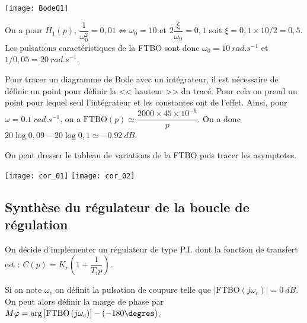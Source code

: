\begin{multicols}{2}

\ifprof
\else
\begin{center}
\texttt{[image: BodeQ1]}
\end{center}
\fi

\ifprof
\begin{corrige}
On a pour $H_1(p)$, $\dfrac{1}{\omega_0^2}=0,01 \Leftrightarrow \omega_0=10$ et $2\dfrac{\xi}{\omega_0}=0,1$ soit $\xi = 0,1\times 10 / 2 = 0,5$. Les pulsations caractéristiques de la FTBO sont donc $\omega_0=\SI{10}{rad.s^{-1}}$ et $1/0,05 = \SI{20}{rad.s^{-1}}$.

Pour tracer un diagramme de Bode avec un intégrateur, il est nécessaire de définir un point pour définir la << hauteur >> du tracé. Pour cela on prend un point pour lequel seul l'intégrateur et les constantes ont de l'effet. Ainsi, pour $\omega=\SI{0,1}{rad.s^{-1}}$, on a $\text{FTBO}(p) \simeq \dfrac{2000\times 45\times 10^{-6}}{p}$. On a donc $20\log 0,09 - 20 \log 0,1 \simeq \SI{-0,92}{dB}$.

On peut dresser le tableau de variations de la FTBO puis tracer les asymptotes. 
\begin{center}
\texttt{[image: cor\_01]}
\texttt{[image: cor\_02]}
\end{center}
\end{corrige}
\else
\fi

\subsection*{Synthèse du régulateur de la boucle de régulation}

On décide d’implémenter un régulateur de type P.I. dont la fonction de transfert
est : $C(p)=K_r\left(1+\dfrac{1}{T_i p} \right)$.


\footnotesize
\begin{methode}
Si on note $\omega_c$ on définit la pulsation de coupure telle que $|\text{FTBO}\left(j \omega_c \right)| = \SI{0}{dB}$. On peut alors définir la marge de phase par $M\varphi=\arg \left[\text{FTBO}\left( j \omega_c\right)\right]-\left(-180\degres\right)$.
\end{methode}


\end{multicols}
